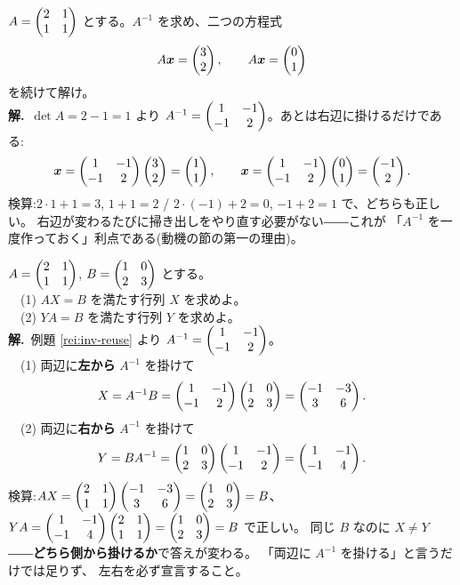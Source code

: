 \begin{rei}[例題・基本(同じ $A$ で右辺だけ変える)]\label{rei:inv-reuse}
$A = \begin{pmatrix}2 & 1 \\ 1 & 1\end{pmatrix}$ とする。$A^{-1}$ を求め、二つの方程式
\[
A\bm{x} = \begin{pmatrix}3 \\ 2\end{pmatrix}, \qquad A\bm{x} = \begin{pmatrix}0 \\ 1\end{pmatrix}
\]
を続けて解け。\\
\textbf{解.}\ $\det A = 2 - 1 = 1$ より
$A^{-1} = \begin{pmatrix}1 & -1 \\ -1 & 2\end{pmatrix}$。あとは右辺に掛けるだけである:
\[
\bm{x} = \begin{pmatrix}1 & -1 \\ -1 & 2\end{pmatrix}\begin{pmatrix}3 \\ 2\end{pmatrix} = \begin{pmatrix}1 \\ 1\end{pmatrix},
\qquad
\bm{x} = \begin{pmatrix}1 & -1 \\ -1 & 2\end{pmatrix}\begin{pmatrix}0 \\ 1\end{pmatrix} = \begin{pmatrix}-1 \\ 2\end{pmatrix}.
\]
検算:$2 \cdot 1 + 1 = 3$, $1 + 1 = 2$ /
$2 \cdot (-1) + 2 = 0$, $-1 + 2 = 1$ で、どちらも正しい。
右辺が変わるたびに掃き出しをやり直す必要がない――これが
「$A^{-1}$ を一度作っておく」利点である(動機の節の第一の理由)。
\end{rei}

\begin{rei}[例題・標準(行列の方程式)]\label{rei:inv-eq}
$A = \begin{pmatrix}2 & 1 \\ 1 & 1\end{pmatrix}$, $B = \begin{pmatrix}1 & 0 \\ 2 & 3\end{pmatrix}$ とする。\\
　(1) $AX = B$ を満たす行列 $X$ を求めよ。\\
　(2) $YA = B$ を満たす行列 $Y$ を求めよ。\\
\textbf{解.}\ 例題 \ref{rei:inv-reuse} より $A^{-1} = \begin{pmatrix}1 & -1 \\ -1 & 2\end{pmatrix}$。\\
　(1) 両辺に\textbf{左から} $A^{-1}$ を掛けて
\[
X = A^{-1}B = \begin{pmatrix}1 & -1 \\ -1 & 2\end{pmatrix}\begin{pmatrix}1 & 0 \\ 2 & 3\end{pmatrix}
= \begin{pmatrix}-1 & -3 \\ 3 & 6\end{pmatrix}.
\]
　(2) 両辺に\textbf{右から} $A^{-1}$ を掛けて
\[
Y = BA^{-1} = \begin{pmatrix}1 & 0 \\ 2 & 3\end{pmatrix}\begin{pmatrix}1 & -1 \\ -1 & 2\end{pmatrix}
= \begin{pmatrix}1 & -1 \\ -1 & 4\end{pmatrix}.
\]
検算:$AX = \begin{pmatrix}2 & 1 \\ 1 & 1\end{pmatrix}\begin{pmatrix}-1 & -3 \\ 3 & 6\end{pmatrix}
= \begin{pmatrix}1 & 0 \\ 2 & 3\end{pmatrix} = B$、
$YA = \begin{pmatrix}1 & -1 \\ -1 & 4\end{pmatrix}\begin{pmatrix}2 & 1 \\ 1 & 1\end{pmatrix}
= \begin{pmatrix}1 & 0 \\ 2 & 3\end{pmatrix} = B$ で正しい。
同じ $B$ なのに $X \neq Y$ ――\textbf{どちら側から掛けるか}で答えが変わる。
「両辺に $A^{-1}$ を掛ける」と言うだけでは足りず、
左右を必ず宣言すること。
\end{rei}

